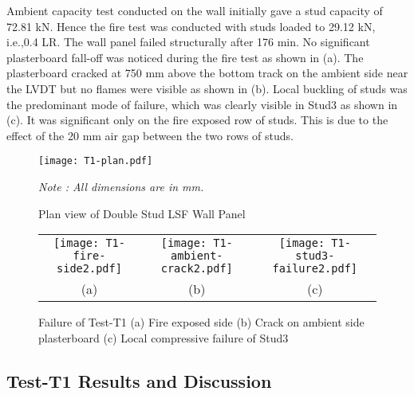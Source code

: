Ambient capacity test conducted on the wall initially gave a stud capacity of 72.81 kN. Hence the fire test was conducted with studs loaded to 29.12 kN, i.e.,0.4 LR. The wall panel failed structurally after 176 min. No significant plasterboard fall-off was noticed during the fire test as shown in  (a). The plasterboard cracked at 750 mm above the bottom track on the ambient side near the LVDT but no flames were visible as shown in  (b). Local buckling of studs was the predominant mode of failure, which was clearly visible in Stud3 as shown in  (c). It was significant only on the fire exposed row of studs. This is due to the effect of the 20 mm air gap between the two rows of studs.
\begin{figure}[htbp]
	\centering
	\texttt{[image: T1-plan.pdf]}
	\caption{Plan view of Double Stud LSF Wall Panel}
	\label{fig:T1-plan}
	\fontsize{10}{1}\textit{Note : All dimensions are in mm.}
\end{figure}
\begin{figure}[htbp]
	\centering
		\begin{tabular}{ccc}
			\texttt{[image: T1-fire-side2.pdf]} & 
			\texttt{[image: T1-ambient-crack2.pdf]} &
			\texttt{[image: T1-stud3-failure2.pdf]} \\	 
			(a) & (b) & (c)  \\ 
		\end{tabular} 
		\caption{Failure of Test-T1 (a) Fire exposed side (b) Crack on ambient side plasterboard (c) Local compressive failure of Stud3}
		\label{fig:T1-failure}
\end{figure}

\subsection{Test-T1 Results and Discussion}

